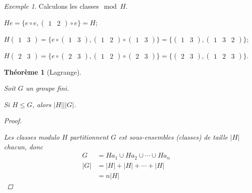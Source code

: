 \documentclass{report}
\newcommand*{\card}[1]{\left| #1 \right|}
\newcommand*{\lte}{\leqslant}
\newtheorem*{thm}{Th\'eor\`eme}
\theoremstyle{definition}
\theoremstyle{remark}
\newtheorem*{exem}{Exemple}
\begin{document}
\begin{exem}
		Calculons les classes$\mod H$.
		\begin{ulist}
			\item $He = \{e \circ e,\begin{pmatrix}
				1&2
			\end{pmatrix} \circ e\} = H$;
			\item $H\begin{pmatrix}
				1&3
			\end{pmatrix} = \{e \circ \begin{pmatrix}
				1&3
			\end{pmatrix}, \begin{pmatrix}
				1&2
			\end{pmatrix} \circ \begin{pmatrix}
				1&3
			\end{pmatrix}\} = \{\begin{pmatrix}
				1&3
			\end{pmatrix}, \begin{pmatrix}
				1&3&2
			\end{pmatrix}\}$;
			\item $H\begin{pmatrix}
				2&3
			\end{pmatrix} = \{e \circ \begin{pmatrix}
				2&3
			\end{pmatrix}, \begin{pmatrix}
				1&2
			\end{pmatrix} \circ \begin{pmatrix}
				2&3
			\end{pmatrix}\} = \{\begin{pmatrix}
				2&3
			\end{pmatrix}, \begin{pmatrix}
				1&2&3
			\end{pmatrix}\}$.
		\end{ulist}
	\end{exem}
	\begin{thm}[Lagrange]~

		Soit $G$ un groupe fini.

		Si $H \lte G$, alors $\card{H} \big| \card{G}$.
		\begin{proof}~

			Les classes modulo $H$ partitionnent $G$ est sous-ensembles (classes) de taille $\card{H}$ chacun, donc
			\begin{align*}
				G&= Ha_1 \cup Ha_2 \cup \dotsb \cup Ha_n\\
				\card{G}&= \card{H} + \card{H} + \dotsb + \card{H}\\
				&= n\card{H}
			\end{align*}
		\end{proof}
	\end{thm}
\end{document}

